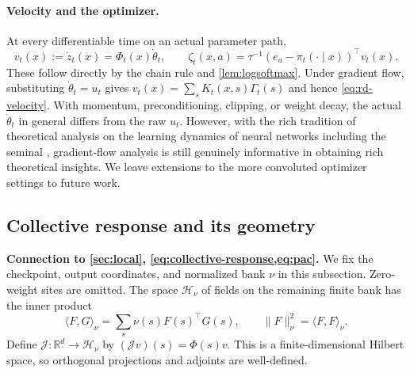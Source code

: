 \paragraph{Velocity and the optimizer.}
At every differentiable time on an actual parameter path,
\[
 v_t(x):=\dot z_t(x)=\Phi_t(x)\dot\theta_t,
 \qquad \zeta_t(x,a)=\tau^{-1}(e_a-\pi_t(\cdot\mid x))^\top v_t(x).
\]
These follow directly by the chain rule and \cref{lem:logsoftmax}. Under gradient flow, substituting $\dot\theta_t=u_t$ gives $v_t(x)=\sum_sK_t(x,s)\Gamma_t(s)$ and hence \cref{eq:rd-velocity}. With momentum, preconditioning, clipping, or weight decay, the actual $\dot\theta_t$ in general differs from the raw $u_t$. However, with the rich tradition of theoretical analysis on the learning dynamics of neural networks including the seminal \cite{ren2025learning, jacot2018neural, pmlr-v97-arora19a}, gradient-flow analysis is still genuinely informative in obtaining rich theoretical insights. We leave extensions to the more convoluted optimizer settings to future work.

\subsection{Collective response and its geometry}
\label{app:collective-proof}\label{app:pac}
\textbf{Connection to \cref{sec:local}, \cref{eq:collective-response,eq:pac}.} We fix the checkpoint, output coordinates, and normalized bank $\nu$ in this subsection. Zero-weight sites are omitted. The space $\mathcal H_\nu$ of fields on the remaining finite bank has the inner product
\[
 \langle F,G\rangle_\nu=\sum_s\nu(s)F(s)^\top G(s),\qquad
 \|F\|_\nu^2=\langle F,F\rangle_\nu.
\]
Define $\mathcal J:\mathbb R^d\to\mathcal H_\nu$ by $(\mathcal Jv)(s)=\Phi(s)v$. This is a finite-dimensional Hilbert space, so orthogonal projections and adjoints are well-defined.

